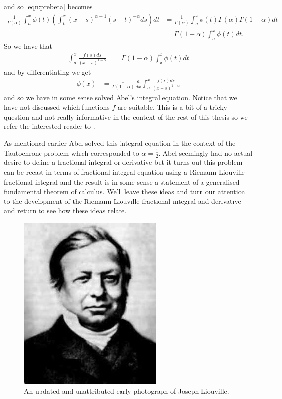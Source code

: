 and so \eqref{eqn:prebeta} becomes
\begin{align}
	\frac{1}{\Gamma(\alpha)} \int_a^x \phi(t) \left( \int_t^x (x-s)^{\alpha-1}(s-t)^{-\alpha} ds\right) dt
		&= \frac{1}{\Gamma(\alpha)} \int_a^x \phi(t) \Gamma(\alpha)\Gamma(1-\alpha) dt \\
		&= \Gamma(1-\alpha)\int_a^x \phi(t) dt. 
\end{align}
So we have that 
\begin{align}
	\int_a^x \frac{f(s)ds}{(x-s)^{1-\alpha}} &= \Gamma(1-\alpha)\int_a^x \phi(t) dt
\end{align}
and by differentiating we get
\begin{align}
	\phi(x) &= \frac{1}{\Gamma(1-\alpha)} \frac{d}{dx} \int_a^x \frac{f(s)ds}{(x-s)^{1-\alpha}}
\end{align}
and so we have in some sense solved Abel's integral equation. Notice that we have not discussed which functions $ f $ are suitable. This is a bit of a tricky question and not really informative in the context of the rest of this thesis so we refer the interested reader to \cite{Samko1993}. 

As mentioned earlier Abel solved this integral equation in the context of the Tautochrone problem which corresponded to $ \alpha = \frac{1}{2} $. Abel seemingly had no actual desire to define a fractional integral or derivative but it turns out this problem can be recast in terms of fractional integral equation using a Riemann Liouville fractional integral and the result is in some sense a statement of a generalised fundamental theorem of calculus. We'll leave these ideas and turn our attention to the development of the Riemann-Liouville fractional integral and derivative and return to see how these ideas relate.

\begin{figure}
    \includegraphics[scale=0.5]{images/Joseph_liouville}
    \caption{An updated and unattributed early photograph of Joseph Liouville.}
\end{figure}

